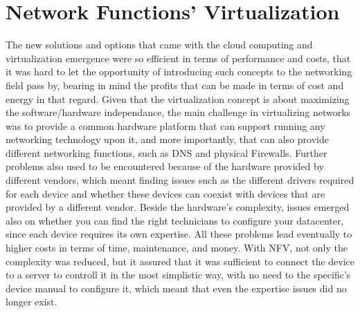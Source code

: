 \section{Network Functions' Virtualization}
The new solutions and options that came with the cloud computing and virtualization emergence were so efficient in terms of performance and costs, that it was hard to let the opportunity of introducing such concepts to the
networking field pass by, bearing in mind the profits that can be made in terms of cost and energy in that regard. Given that the virtualization concept is about maximizing the software/hardware independance, the main challenge in virtualizing networks was to provide a common hardware platform that can support running any networking technology upon it, and more importantly, that can also provide different networking functions, such as
DNS and physical Firewalls. Further problems also used to be encountered because of the hardware provided by different vendors, which meant finding issues such as the different drivers required for each device and whether these devices can coexist with devices that are provided by a different vendor. Beside the hardware’s complexity, issues emerged also on whether you can find the right
technicians to configure your datacenter, since each device requires its own expertise. All these problems lead eventually to higher costs in terms of time, maintenance, and money. With NFV, not only the complexity was reduced,
but it assured that it was sufficient to connect the device to a server to controll it in the most simplistic way, with no need to the specific’s device manual to configure it, which meant that even the expertise issues did no longer exist.
